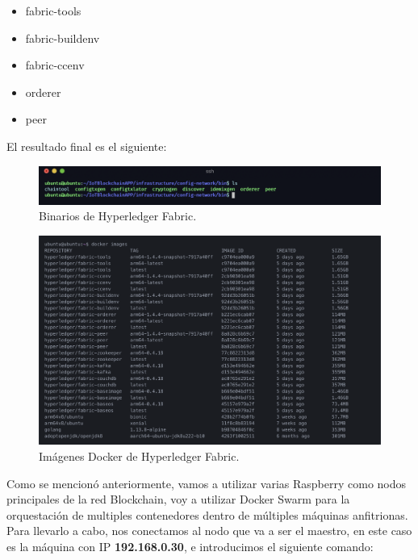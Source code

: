 \begin{itemize}
  \item fabric-tools
  \item fabric-buildenv
  \item fabric-ccenv
  \item orderer
  \item peer
\end{itemize}

\newpage

\noindent El resultado final es el siguiente:

\begin{figure}[ht!]
  \centering
  \includegraphics[width=\textwidth]{imagenes/desarrollo/binarios_fabric}
  \caption{Binarios de Hyperledger Fabric.}
  \label{fig:binarios-fabric}
\end{figure}

\begin{figure}[ht!]
  \centering
  \includegraphics[width=\textwidth]{imagenes/desarrollo/imagenes_docker}
  \caption{Imágenes Docker de Hyperledger Fabric.}
  \label{fig:imagenes-docker}
\end{figure}

\noindent Como se mencionó anteriormente, vamos a utilizar varias Raspberry como nodos principales de la red 
Blockchain, voy a utilizar Docker Swarm para la orquestación de multiples contenedores dentro de múltiples 
máquinas anfitrionas. Para llevarlo a cabo, nos conectamos al nodo que va a ser el maestro, en este caso es la
máquina con IP \textbf{192.168.0.30}, e introducimos el siguiente comando:

